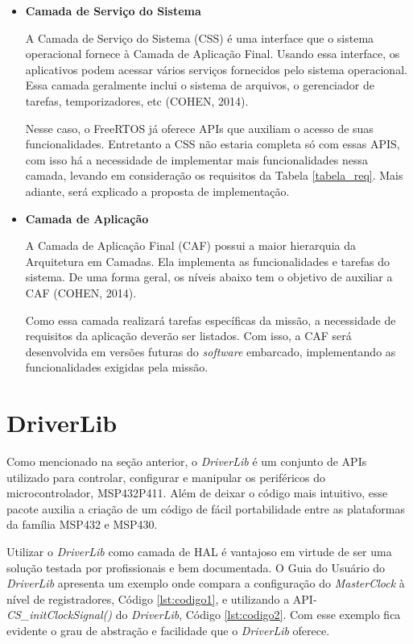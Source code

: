 \begin{itemize}
\item \textbf{Camada de Serviço do Sistema}

A Camada de Serviço do Sistema (CSS) é uma interface que o sistema operacional fornece à Camada de Aplicação Final. Usando essa interface, os aplicativos podem acessar vários serviços fornecidos pelo sistema operacional. Essa camada geralmente inclui o sistema de arquivos, o gerenciador de tarefas, temporizadores, etc (COHEN, 2014).

Nesse caso, o FreeRTOS já oferece APIs que auxiliam o acesso de suas funcionalidades. Entretanto a CSS não estaria completa só com essas APIS, com isso há a necessidade de implementar mais funcionalidades nessa camada, levando em consideração os requisitos da Tabela \ref{tabela_req}. Mais adiante, será explicado a proposta de implementação.


\item \textbf{Camada de Aplicação}

A Camada de Aplicação Final (CAF) possui a maior hierarquia da Arquitetura em Camadas. Ela implementa as funcionalidades e tarefas do sistema. De uma forma geral, os níveis abaixo tem o objetivo de auxiliar a CAF (COHEN, 2014).

Como essa camada realizará tarefas específicas da missão, a necessidade de requisitos da aplicação deverão ser listados. Com isso, a CAF será desenvolvida em versões futuras do \textit{software} embarcado, implementando as funcionalidades exigidas pela missão.



\end{itemize}

\section{DriverLib}

Como mencionado na seção anterior, o \textit{DriverLib} é um conjunto de APIs utilizado para controlar, configurar e manipular os periféricos do microcontrolador, MSP432P411. Além de deixar o código mais intuitivo, esse pacote auxilia a criação de um código de fácil portabilidade entre as plataformas da família MSP432 e MSP430.

Utilizar o \textit{DriverLib} como camada de HAL é vantajoso em virtude de ser uma solução testada por profissionais e bem documentada. O Guia do Usuário do \textit{DriverLib} apresenta um exemplo onde compara a configuração do \textit{MasterClock} à nível de registradores, Código \ref{lst:codigo1}, e utilizando a API-\textit{CS\_initClockSignal()} do \textit{DriverLib}, Código \ref{lst:codigo2}. Com esse exemplo fica evidente o grau de abstração e facilidade que o \textit{DriverLib} oferece.

